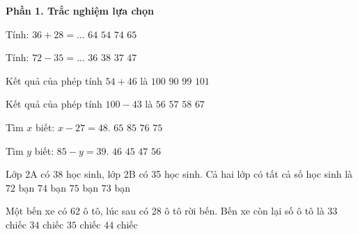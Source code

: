 \textbf{Phần 1. Trắc nghiệm lựa chọn}

\begin{ex} %
Tính: $36 + 28 = \dots$
\choice
{\True $64$}
{$54$}
{$74$}
{$65$}
\end{ex}

\begin{ex} %
Tính: $72 - 35 = \dots$
\choice
{$36$}
{$38$}
{\True $37$}
{$47$}
\end{ex}

\begin{ex} %
Kết quả của phép tính $54 + 46$ là
\choice
{\True $100$}
{$90$}
{$99$}
{$101$}
\end{ex}

\begin{ex} %
Kết quả của phép tính $100 - 43$ là
\choice
{$56$}
{\True $57$}
{$58$}
{$67$}
\end{ex}

\begin{ex} %
Tìm $x$ biết: $x - 27 = 48$.
\choice
{$65$}
{$85$}
{$76$}
{\True $75$}
\end{ex}

\begin{ex} %
Tìm $y$ biết: $85 - y = 39$.
\choice
{\True $46$}
{$45$}
{$47$}
{$56$}
\end{ex}

\begin{ex} %
Lớp 2A có 38 học sinh, lớp 2B có 35 học sinh. Cả hai lớp có tất cả số học sinh là
\choice
{$72$ bạn}
{$74$ bạn}
{$75$ bạn}
{\True $73$ bạn}
\end{ex}

\begin{ex} %
Một bến xe có 62 ô tô, lúc sau có 28 ô tô rời bến. Bến xe còn lại số ô tô là
\choice
{$33$ chiếc}
{\True $34$ chiếc}
{$35$ chiếc}
{$44$ chiếc}
\end{ex}

